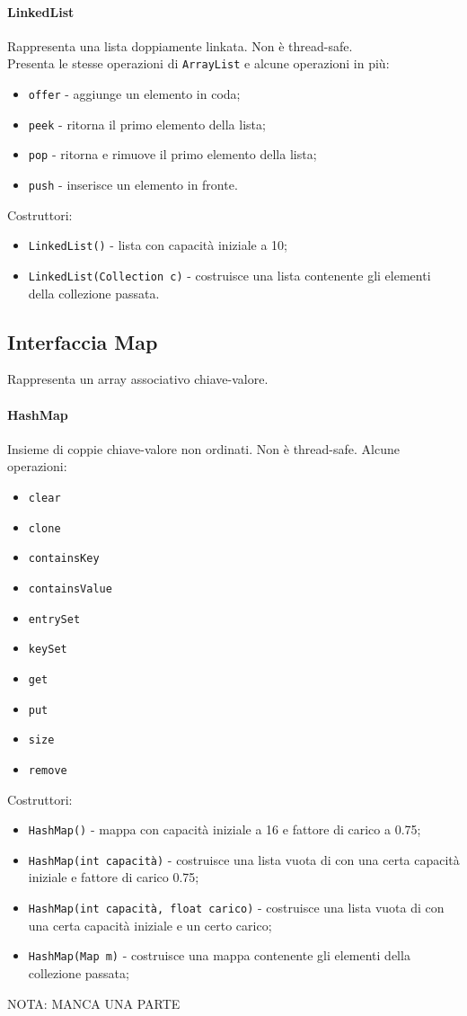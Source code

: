 \paragraph{LinkedList}
Rappresenta una lista doppiamente linkata. Non è thread-safe. \\ Presenta le stesse operazioni di \texttt{ArrayList} e alcune operazioni in più:
\begin{itemize}
\item \texttt{offer} - aggiunge un elemento in coda;
\item \texttt{peek} - ritorna il primo elemento della lista;
\item \texttt{pop} - ritorna e rimuove il primo elemento della lista;
\item \texttt{push} - inserisce un elemento in fronte.
\end{itemize}
Costruttori:
\begin{itemize}
\item \texttt{LinkedList()} - lista con capacità iniziale a 10;
\item \texttt{LinkedList(Collection c)} - costruisce una lista contenente gli elementi della collezione passata.
\end{itemize}

\subsection{Interfaccia Map}
Rappresenta un array associativo chiave-valore.
\paragraph{HashMap}
Insieme di coppie chiave-valore non ordinati. Non è thread-safe. Alcune operazioni:
\begin{itemize}
\item \texttt{clear}
\item \texttt{clone}
\item \texttt{containsKey}
\item \texttt{containsValue}
\item \texttt{entrySet}
\item \texttt{keySet}
\item \texttt{get}
\item \texttt{put}
\item \texttt{size}
\item \texttt{remove}
\end{itemize}
Costruttori:
\begin{itemize}
\item \texttt{HashMap()} - mappa con capacità iniziale a 16 e fattore di carico a 0.75;
\item \texttt{HashMap(int capacità)} - costruisce una lista vuota di con una certa capacità iniziale e fattore di carico 0.75;
\item \texttt{HashMap(int capacità, float carico)} - costruisce una lista vuota di con una certa capacità iniziale e un certo carico;
\item \texttt{HashMap(Map m)} - costruisce una mappa contenente gli elementi della collezione passata;
\end{itemize}
NOTA: MANCA UNA PARTE

